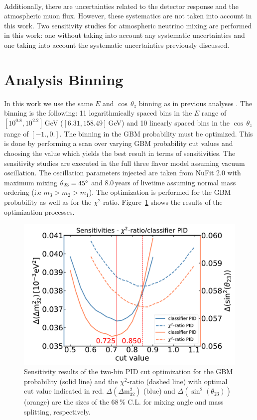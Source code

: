 \paragraph{}

Additionally, there are uncertainties related to the detector response and the atmospheric muon flux.
However, these systematics are not taken into account in this work.
Two sensitivity studies for atmospheric neutrino mixing are performed in this work: one without taking into account any systematic uncertainties and one taking into account the systematic uncertainties previously discussed.


\section{Analysis Binning} \label{sec:pid_optimization}

In this work we use the same $E$ and $\cos\,\theta_z$ binning as in previous analyses \cite{ATerliuk}.
The binning is the following: 11 logarithmically spaced bins in the $E$ range of $[10^{0.8},10^{2.2}]$\,GeV ($[6.31,158.49]$\,GeV) and 10 linearly spaced bins in the $\cos\,\theta_z$ range of $[-1.,0.]$.
The binning in the GBM probability must be optimized.
This is done by performing a scan over varying GBM probability cut values and choosing the value which yields the best result in terms of sensitivities.
The sensitivity studies are executed in the full three flavor model assuming vacuum oscillation.
The oscillation parameters injected are taken from NuFit 2.0 \cite{Gonzalez-Garcia2014} with maximum mixing $\theta_{23}=45\degree$ and 8.0\,years of livetime assuming normal mass ordering (i.e $m_3 > m_2 > m_1$).
The optimization is performed for the GBM probability as well as for the $\chi^2$-ratio.
Figure~\ref{fig:optimizing_two_bins} shows the results of the optimization processes.

\begin{figure}[h]
    \centering
    \includegraphics[width=0.8\linewidth]{figures/pid_optimization_combined.pdf}
    \caption[Sensitivity results of the two-bin PID cut optimization]
    {Sensitivity results of the two-bin PID cut optimization for the GBM probability (solid line) and the $\chi^2$-ratio (dashed line) with optimal cut value indicated in red. $\Delta(\Delta \mathrm{m}^{2}_{32})$ (blue) and $\Delta(\sin^{2}(\theta_{23}))$ (orange) are the sizes of the $68$\,\% C.L. for mixing angle and mass splitting, respectively.}
    \label{fig:optimizing_two_bins}
\end{figure}


